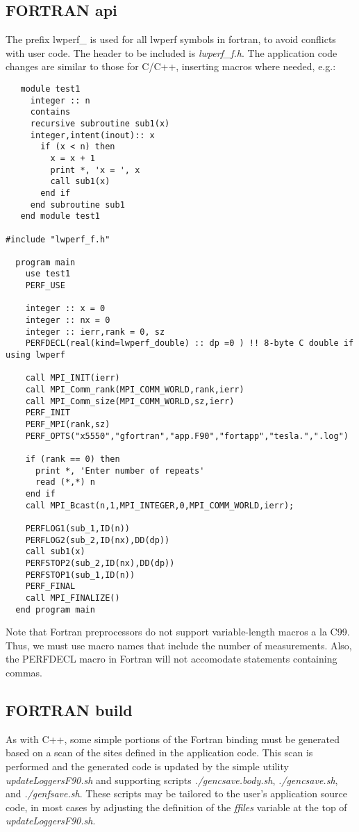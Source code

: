 \documentclass{article}
\begin{document}
\subsection{FORTRAN api}
\label{sec:fapi}
The prefix lwperf\_ is used for all lwperf symbols in fortran, to avoid conflicts with user code. The header to be included is {\em lwperf\_f.h}. 
The application code changes are similar to those for C/C++, inserting macros where needed, e.g.:
\begin{verbatim}
   module test1
     integer :: n
     contains
     recursive subroutine sub1(x)
     integer,intent(inout):: x
       if (x < n) then
         x = x + 1
         print *, 'x = ', x
         call sub1(x)
       end if
     end subroutine sub1
   end module test1

#include "lwperf_f.h"

  program main
    use test1
    PERF_USE

    integer :: x = 0
    integer :: nx = 0
    integer :: ierr,rank = 0, sz
    PERFDECL(real(kind=lwperf_double) :: dp =0 ) !! 8-byte C double if using lwperf

    call MPI_INIT(ierr)
    call MPI_Comm_rank(MPI_COMM_WORLD,rank,ierr)
    call MPI_Comm_size(MPI_COMM_WORLD,sz,ierr)
    PERF_INIT
    PERF_MPI(rank,sz)
    PERF_OPTS("x5550","gfortran","app.F90","fortapp","tesla.",".log") 

    if (rank == 0) then
      print *, 'Enter number of repeats'
      read (*,*) n
    end if
    call MPI_Bcast(n,1,MPI_INTEGER,0,MPI_COMM_WORLD,ierr);

    PERFLOG1(sub_1,ID(n)) 
    PERFLOG2(sub_2,ID(nx),DD(dp))
    call sub1(x)
    PERFSTOP2(sub_2,ID(nx),DD(dp))
    PERFSTOP1(sub_1,ID(n))
    PERF_FINAL
    call MPI_FINALIZE()
  end program main
\end{verbatim}

Note that Fortran preprocessors do not support variable-length macros a la C99. Thus, we must use macro names that include the number of measurements. Also, the PERFDECL macro in Fortran will not
accomodate statements containing commas.

\subsection{FORTRAN build}
\label{sec:fbuild}
As with C++, some simple portions of the Fortran binding must be generated based on a scan of the sites defined in the application code. This scan is performed and the generated code is updated by the simple utility {\em updateLoggersF90.sh} and supporting scripts {\em ./gencsave.body.sh}, {\em ./gencsave.sh}, and {\em ./genfsave.sh}. These scripts may be tailored to the user's application source code, in most cases by adjusting the definition of the {\em ffiles} variable at the top of {\em updateLoggersF90.sh}.
\end{document}
